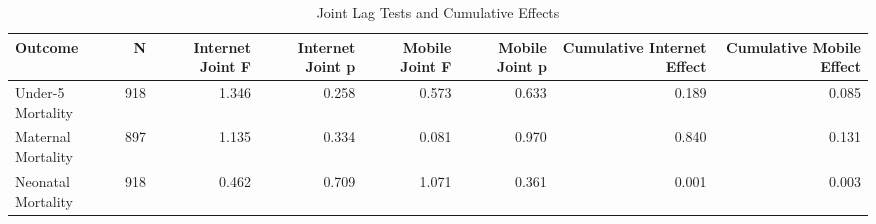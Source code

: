 \begin{table}

\caption{\label{tab:tab:joint_lag_tests}Joint Lag Tests and Cumulative Effects}
\centering
\begin{tabular}[t]{lrrrrrrr}
\toprule
Outcome & N & Internet Joint F & Internet Joint p & Mobile Joint F & Mobile Joint p & Cumulative Internet Effect & Cumulative Mobile Effect\\
\midrule
Under-5 Mortality & 918 & 1.346 & 0.258 & 0.573 & 0.633 & 0.189 & 0.085\\
Maternal Mortality & 897 & 1.135 & 0.334 & 0.081 & 0.970 & 0.840 & 0.131\\
Neonatal Mortality & 918 & 0.462 & 0.709 & 1.071 & 0.361 & 0.001 & 0.003\\
\bottomrule
\end{tabular}
\end{table}

